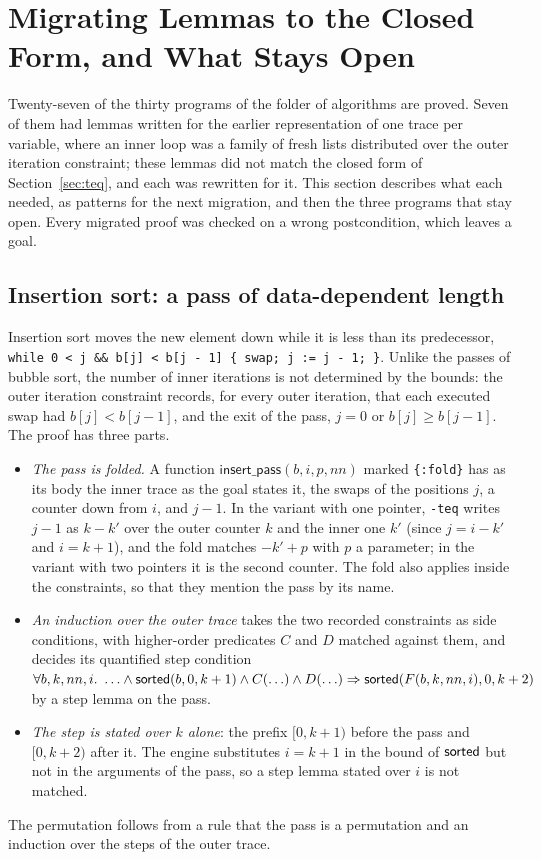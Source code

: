 \section{Migrating Lemmas to the Closed Form, and What Stays Open}\label{sec:open}

Twenty-seven of the thirty programs of the folder of algorithms are proved. Seven of them had lemmas written for the
earlier representation of one trace per variable, where an inner loop was a family of fresh lists distributed over the
outer iteration constraint; these lemmas did not match the closed form of Section~\ref{sec:teq}, and each was
rewritten for it. This section describes what each needed, as patterns for the next migration, and then the three
programs that stay open. Every migrated proof was checked on a wrong postcondition, which leaves a goal.

\subsection{Insertion sort: a pass of data-dependent length}\label{sec:open:insertion}
Insertion sort moves the new element down while it is less than its predecessor,
\texttt{while 0 < j \&\& b[j] < b[j - 1] \{ swap; j := j - 1; \}}. Unlike the passes of bubble sort, the number of
inner iterations is not determined by the bounds: the outer iteration constraint records, for every outer iteration,
that each executed swap had $b[j] < b[j - 1]$, and the exit of the pass, $j = 0$ or $b[j] \ge b[j - 1]$. The proof has
three parts.
\begin{itemize}[nosep]
\item \emph{The pass is folded.} A function $\mathsf{insert\_pass}(b, i, p, nn)$ marked \texttt{\{:fold\}} has as its
  body the inner trace as the goal states it, the swaps of the positions $j$, a counter down from $i$, and $j - 1$. In
  the variant with one pointer, \texttt{-teq} writes $j - 1$ as $k - k'$ over the outer counter $k$ and the inner one
  $k'$ (since $j = i - k'$ and $i = k + 1$), and the fold matches $-k' + p$ with $p$ a parameter; in the variant with
  two pointers it is the second counter. The fold also applies inside the constraints, so that they mention the pass
  by its name.
\item \emph{An induction over the outer trace} takes the two recorded constraints as side conditions, with
  higher-order predicates $C$ and $D$ matched against them, and decides its quantified step condition
  $\forall b, k, nn, i.\ \ldots \wedge \mathsf{sorted}(b, 0, k + 1) \wedge C(\ldots) \wedge D(\ldots) \Rightarrow
  \mathsf{sorted}(F(b, k, nn, i), 0, k + 2)$ by a step lemma on the pass.
\item \emph{The step is stated over $k$ alone}: the prefix $[0, k + 1)$ before the pass and $[0, k + 2)$ after it. The
  engine substitutes $i = k + 1$ in the bound of $\mathsf{sorted}$ but not in the arguments of the pass, so a step lemma
  stated over $i$ is not matched.
\end{itemize}
The permutation follows from a rule that the pass is a permutation and an induction over the steps of the outer trace.

